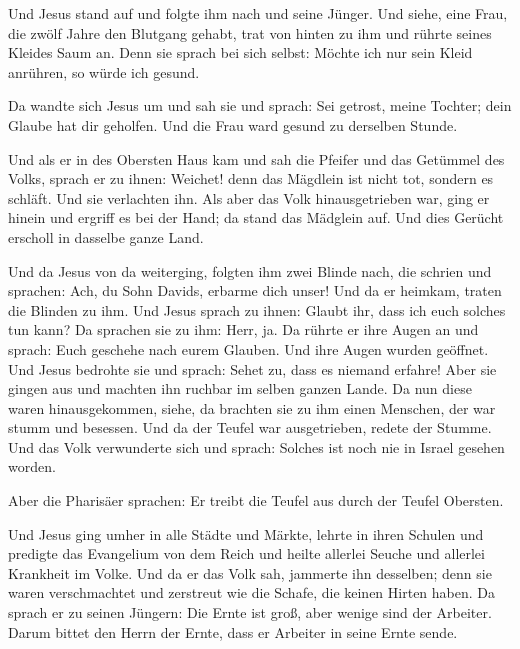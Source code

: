  Und Jesus stand auf und folgte ihm nach und seine
Jünger.  Und siehe, eine Frau, die zwölf Jahre den
Blutgang gehabt, trat von hinten zu ihm und rührte seines Kleides Saum
an.  Denn sie sprach bei sich selbst: Möchte ich nur sein
Kleid anrühren, so würde ich gesund.

 Da wandte sich Jesus um und sah sie und sprach: Sei
getrost, meine Tochter; dein Glaube hat dir geholfen. Und die Frau ward
gesund zu derselben Stunde.

 Und als er in des Obersten Haus kam und sah die Pfeifer
und das Getümmel des Volks,  sprach er zu ihnen: Weichet!
denn das Mägdlein ist nicht tot, sondern es schläft. Und sie verlachten
ihn.  Als aber das Volk hinausgetrieben war, ging er
hinein und ergriff es bei der Hand; da stand das Mädglein auf.
 Und dies Gerücht erscholl in dasselbe ganze Land.

 Und da Jesus von da weiterging, folgten ihm zwei Blinde
nach, die schrien und sprachen: Ach, du Sohn Davids, erbarme dich unser!
 Und da er heimkam, traten die Blinden zu ihm. Und Jesus
sprach zu ihnen: Glaubt ihr, dass ich euch solches tun kann? Da sprachen
sie zu ihm: Herr, ja.  Da rührte er ihre Augen an und
sprach: Euch geschehe nach eurem Glauben.  Und ihre Augen
wurden geöffnet. Und Jesus bedrohte sie und sprach: Sehet zu, dass es
niemand erfahre!  Aber sie gingen aus und machten ihn
ruchbar im selben ganzen Lande.  Da nun diese waren
hinausgekommen, siehe, da brachten sie zu ihm einen Menschen, der war
stumm und besessen.  Und da der Teufel war ausgetrieben,
redete der Stumme. Und das Volk verwunderte sich und sprach: Solches ist
noch nie in Israel gesehen worden.

 Aber die Pharisäer sprachen: Er treibt die Teufel aus
durch der Teufel Obersten.

 Und Jesus ging umher in alle Städte und Märkte, lehrte
in ihren Schulen und predigte das Evangelium von dem Reich und heilte
allerlei Seuche und allerlei Krankheit im Volke.  Und da
er das Volk sah, jammerte ihn desselben; denn sie waren verschmachtet
und zerstreut wie die Schafe, die keinen Hirten haben. 
Da sprach er zu seinen Jüngern: Die Ernte ist groß, aber wenige sind der
Arbeiter.  Darum bittet den Herrn der Ernte, dass er
Arbeiter in seine Ernte sende.

